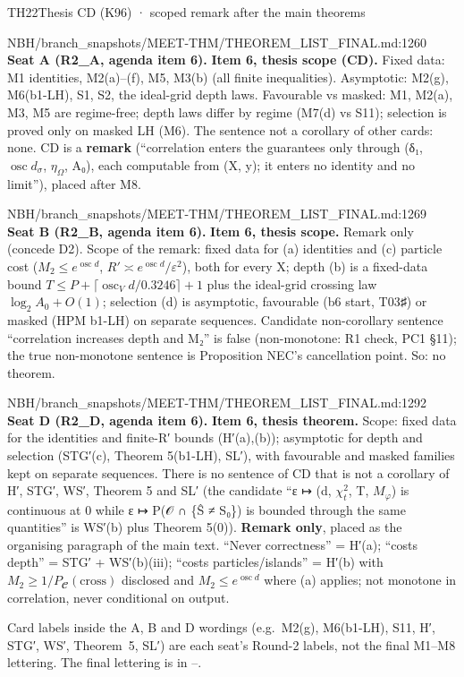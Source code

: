 \begin{card}{TH22}{Thesis CD (K96) · scoped remark after the main theorems}
\begin{stmt}{NBH/branch_snapshots/MEET-THM/THEOREM_LIST_FINAL.md:1260}
\textbf{Seat A (R2\_A, agenda item 6).} \textbf{Item 6, thesis scope (CD).} Fixed data: M1 identities, M2(a)–(f), M5, M3(b) (all finite inequalities). Asymptotic: M2(g), M6(b1-LH), S1, S2, the ideal-grid depth laws. Favourable vs masked: M1, M2(a), M3, M5 are regime-free; depth laws differ by regime (M7(d) vs S11); selection is proved only on masked LH (M6). The sentence not a corollary of other cards: none. CD is a \textbf{remark} (``correlation enters the guarantees only through (δ₁, $\operatorname{osc} d_σ$, $η_Ω$, A₀), each computable from (X, y); it enters no identity and no limit''), placed after M8.
\end{stmt}

\begin{stmt}{NBH/branch_snapshots/MEET-THM/THEOREM_LIST_FINAL.md:1269}
\textbf{Seat B (R2\_B, agenda item 6).} \textbf{Item 6, thesis scope.} Remark only (concede D2). Scope of the remark: fixed data for (a) identities and (c) particle cost ($M_2 ≤ e^{\operatorname{osc} d}$, $R′ ≍ e^{\operatorname{osc} d}/ε^2$), both for every X; depth (b) is a fixed-data bound $T ≤ P + ⌈\operatorname{osc}_V d/0.3246⌉ + 1$ plus the ideal-grid crossing law $\log_2A_0 + O(1)$; selection (d) is asymptotic, favourable (b6 start, T03♯) or masked (HPM b1-LH) on separate sequences. Candidate non-corollary sentence ``correlation increases depth and M₂'' is false (non-monotone: R1 check, PC1 §11); the true non-monotone sentence is Proposition NEC's cancellation point. So: no theorem.
\end{stmt}

\begin{stmt}{NBH/branch_snapshots/MEET-THM/THEOREM_LIST_FINAL.md:1292}
\textbf{Seat D (R2\_D, agenda item 6).} \textbf{Item 6, thesis theorem.} Scope: fixed data for the identities and finite-R′ bounds (H′(a),(b)); asymptotic for depth and selection (STG′(c), Theorem 5(b1-LH), SL′), with favourable and masked families kept on separate sequences. There is no sentence of CD that is not a corollary of H′, STG′, WS′, Theorem 5 and SL′ (the candidate ``ε ↦ (d, $χ^2_t$, T, $M_φ$) is continuous at 0 while ε ↦ P(𝒪 ∩ \{Ŝ ≠ S₀\}) is bounded through the same quantities'' is WS′(b) plus Theorem 5(0)). \textbf{Remark only}, placed as the organising paragraph of the main text. ``Never correctness'' = H′(a); ``costs depth'' = STG′ + WS′(b)(iii); ``costs particles/islands'' = H′(b) with $M_2 ≥ 1/P_{𝓒}(\mathrm{cross})$ disclosed and $M_2 ≤ e^{\operatorname{osc} d}$ where (a) applies; not monotone in correlation, never conditional on output.
\end{stmt}
Card labels inside the A, B and D wordings (e.g.\ M2(g), M6(b1-LH), S11, H′, STG′, WS′, Theorem~5, SL′) are each seat's Round-2 labels, not the final M1--M8 lettering. The final lettering is in --.


\end{card}
